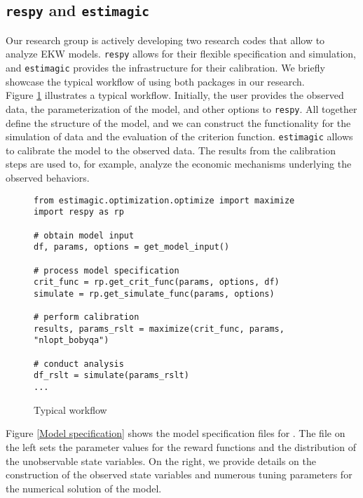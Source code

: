 \subsection{\texttt{respy} and \texttt{estimagic}}
Our research group is actively developing two research codes that allow to analyze EKW models. \verb+respy+ allows for their flexible specification and simulation, and \verb+estimagic+ provides the infrastructure for their calibration. We briefly showcase the typical workflow of using both packages in our research.\\

\noindent Figure \ref{Typical workflow} illustrates a typical workflow. Initially, the user provides the observed data, the parameterization of the model, and other options to \verb+respy+. All together define the structure of the model, and we can construct the functionality for the simulation of data and the evaluation of the criterion function. \verb+estimagic+ allows to calibrate the model to the observed data. The results from the calibration steps are used to, for example, analyze the economic mechanisms underlying the observed behaviors.

\begin{figure}[ht!]\centering
\caption{Typical workflow}\label{Typical workflow}
\begin{lstlisting}
from estimagic.optimization.optimize import maximize
import respy as rp

# obtain model input
df, params, options = get_model_input()

# process model specification
crit_func = rp.get_crit_func(params, options, df)
simulate = rp.get_simulate_func(params, options)

# perform calibration
results, params_rslt = maximize(crit_func, params, "nlopt_bobyqa")

# conduct analysis
df_rslt = simulate(params_rslt)
...

\end{lstlisting}
\end{figure}\FloatBarrier

\noindent Figure \ref{Model specification} shows the model specification files for \citet{Keane.1994}. The file on the left sets the parameter values for the reward functions and the distribution of the unobservable state variables. On the right, we provide details on the construction of the observed state variables and numerous tuning parameters for the numerical solution of the model.

